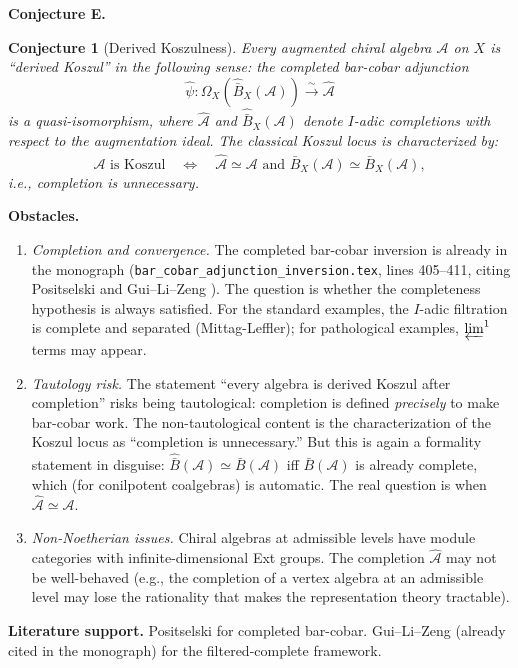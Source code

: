 \documentclass[11pt]{article}
\newtheorem{conjecture}{Conjecture}
\theoremstyle{remark}
\newcommand{\cA}{\mathcal{A}}
\newcommand{\barB}{\bar{B}}
\begin{document}
\textbf{Conjecture E.}
\begin{conjecture}[Derived Koszulness]\label{conj:derived}
Every augmented chiral algebra $\cA$ on $X$ is ``derived Koszul'' in the following sense: the completed bar-cobar adjunction
\[
\hat{\psi}\colon \Omega_X(\widehat{\barB}_X(\cA)) \xrightarrow{\sim} \hat{\cA}
\]
is a quasi-isomorphism, where $\hat{\cA}$ and $\widehat{\barB}_X(\cA)$ denote $I$-adic completions with respect to the augmentation ideal.  The classical Koszul locus is characterized by:
\[
\cA \text{ is Koszul} \quad\Longleftrightarrow\quad \hat{\cA} \simeq \cA \text{ and } \widehat{\barB}_X(\cA) \simeq \barB_X(\cA),
\]
i.e., completion is unnecessary.
\end{conjecture}

\textbf{Obstacles.}
\begin{enumerate}[label=(E\arabic*)]
\item \emph{Completion and convergence.}  The completed bar-cobar inversion is already in the monograph (\texttt{bar\_cobar\_adjunction\_inversion.tex}, lines 405--411, citing Positselski and Gui--Li--Zeng \cite{GLZ22}).  The question is whether the completeness hypothesis is always satisfied.  For the standard examples, the $I$-adic filtration is complete and separated (Mittag-Leffler); for pathological examples, $\varprojlim^1$ terms may appear.

\item \emph{Tautology risk.}  The statement ``every algebra is derived Koszul after completion'' risks being tautological: completion is defined \emph{precisely} to make bar-cobar work.  The non-tautological content is the characterization of the Koszul locus as ``completion is unnecessary.''  But this is again a formality statement in disguise: $\widehat{\barB}(\cA) \simeq \barB(\cA)$ iff $\barB(\cA)$ is already complete, which (for conilpotent coalgebras) is automatic.  The real question is when $\hat{\cA} \simeq \cA$.

\item \emph{Non-Noetherian issues.}  Chiral algebras at admissible levels have module categories with infinite-dimensional Ext groups.  The completion $\hat{\cA}$ may not be well-behaved (e.g., the completion of a vertex algebra at an admissible level may lose the rationality that makes the representation theory tractable).
\end{enumerate}

\textbf{Literature support.}  Positselski \cite{Positselski11} for completed bar-cobar.  Gui--Li--Zeng \cite{GLZ22} (already cited in the monograph) for the filtered-complete framework.
\end{document}
